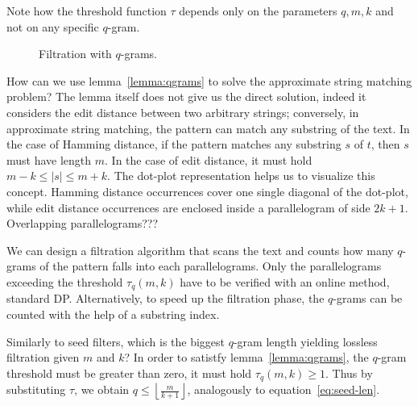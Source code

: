 Note how the threshold function $\tau$ depends only on the parameters $q,m,k$ and not on any specific $q$-gram.

\begin{figure}[h]
\begin{center}
\caption{Filtration with $q$-grams.}
\label{fig:qgrams-ext}

\end{center}
\end{figure}

How can we use lemma~\ref{lemma:qgrams} to solve the approximate string matching problem?
The lemma itself does not give us the direct solution, indeed it considers the edit distance between two arbitrary strings; conversely, in approximate string matching, the pattern can match any substring of the text.
In the case of Hamming distance, if the pattern matches any substring $s$ of $t$, then $s$ must have length $m$.
In the case of edit distance, it must hold $m - k \leq |s| \leq m + k$.
The dot-plot representation helps us to visualize this concept.
Hamming distance occurrences cover one single diagonal of the dot-plot, while edit distance occurrences are enclosed inside a parallelogram of side $2k+1$.
Overlapping parallelograms???

We can design a filtration algorithm that scans the text and counts how many $q$-grams of the pattern falls into each parallelograms.
Only the parallelograms exceeding the threshold $\tau_q(m,k)$ have to be verified with an online method, \eg standard DP.
Alternatively, to speed up the filtration phase, the $q$-grams can be counted with the help of a substring index.

Similarly to seed filters, which is the biggest $q$-gram length yielding lossless filtration given $m$ and $k$?
In order to satistfy lemma~\ref{lemma:qgrams}, the $q$-gram threshold must be greater than zero, \ie it must hold $\tau_q(m,k) \geq 1$.
Thus by substituting $\tau$, we obtain $q \leq \left \lfloor \frac{m}{k+1} \right \rfloor$, analogously to equation~\ref{eq:seed-len}.


